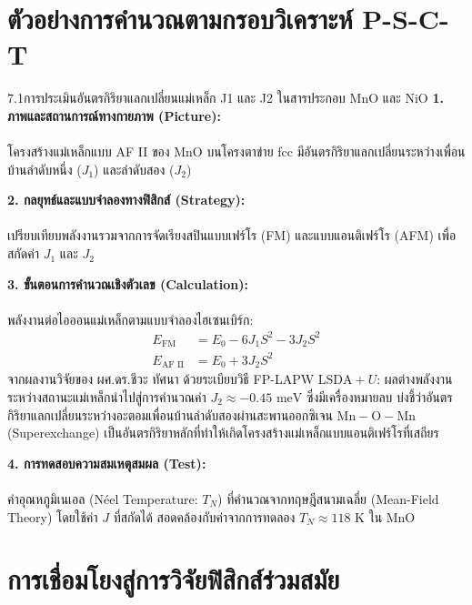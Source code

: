\section{ตัวอย่างการคำนวณตามกรอบวิเคราะห์ P-S-C-T}

\begin{psctexample}{7.1}{การประเมินอันตรกิริยาแลกเปลี่ยนแม่เหล็ก J1 และ J2 ในสารประกอบ MnO และ NiO}
\textbf{1. ภาพและสถานการณ์ทางกายภาพ (Picture):}\\\\ โครงสร้างแม่เหล็กแบบ AF II ของ MnO บนโครงตาข่าย fcc มีอันตรกิริยาแลกเปลี่ยนระหว่างเพื่อนบ้านลำดับหนึ่ง ($J_1$) และลำดับสอง ($J_2$)

\vspace{4pt}
\textbf{2. กลยุทธ์และแบบจำลองทางฟิสิกส์ (Strategy):}\\\\ เปรียบเทียบพลังงานรวมจากการจัดเรียงสปินแบบเฟร์โร (FM) และแบบแอนติเฟร์โร (AFM) เพื่อสกัดค่า $J_1$ และ $J_2$

\vspace{4pt}
\textbf{3. ขั้นตอนการคำนวณเชิงตัวเลข (Calculation):}\\\\ พลังงานต่อไอออนแม่เหล็กตามแบบจำลองไฮเซนเบิร์ก:
\begin{align}
E_{\text{FM}} &= E_0 - 6 J_1 S^2 - 3 J_2 S^2 \\
E_{\text{AF II}} &= E_0 + 3 J_2 S^2
\end{align}
จากผลงานวิจัยของ ผศ.ดร.ชีวะ ทัศนา ด้วยระเบียบวิธี FP-LAPW $\text{LSDA}+U$:
ผลต่างพลังงานระหว่างสถานะแม่เหล็กนำไปสู่การคำนวณค่า $J_2 \approx -0.45\text{ meV}$ ซึ่งมีเครื่องหมายลบ บ่งชี้ว่าอันตรกิริยาแลกเปลี่ยนระหว่างอะตอมเพื่อนบ้านลำดับสองผ่านสะพานออกซิเจน $\text{Mn}-\text{O}-\text{Mn}$ (Superexchange) เป็นอันตรกิริยาหลักที่ทำให้เกิดโครงสร้างแม่เหล็กแบบแอนติเฟร์โรที่เสถียร

\vspace{4pt}
\textbf{4. การทดสอบความสมเหตุสมผล (Test):}\\\\ ค่าอุณหภูมิเนเอล (Néel Temperature: $T_N$) ที่คำนวณจากทฤษฎีสนามเฉลี่ย (Mean-Field Theory) โดยใช้ค่า $J$ ที่สกัดได้ สอดคล้องกับค่าจากการทดลอง $T_N \approx 118\text{ K}$ ใน $\text{MnO}$
\end{psctexample}

\section{การเชื่อมโยงสู่การวิจัยฟิสิกส์ร่วมสมัย}

